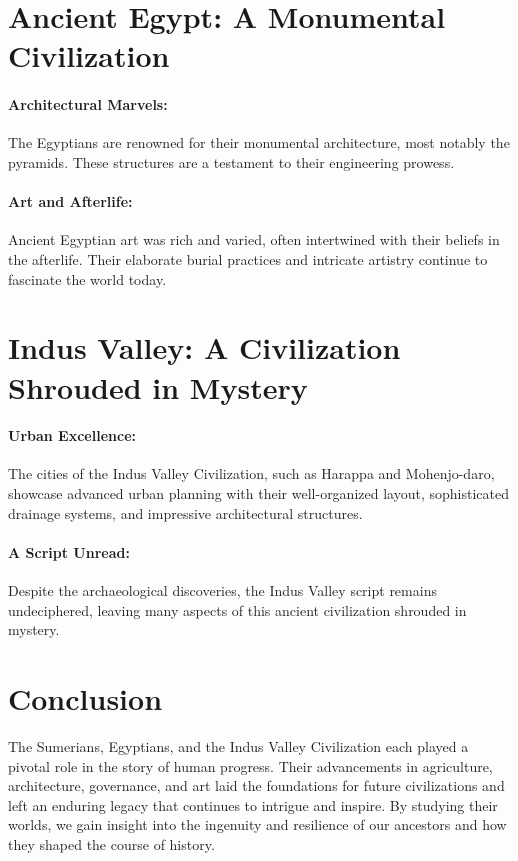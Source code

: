 \documentclass{book}
\begin{document}
\section*{Ancient Egypt: A Monumental Civilization}

\paragraph{Architectural Marvels:}
The Egyptians are renowned for their monumental architecture, most notably the pyramids. These structures are a testament to their engineering prowess.

\paragraph{Art and Afterlife:}
Ancient Egyptian art was rich and varied, often intertwined with their beliefs in the afterlife. Their elaborate burial practices and intricate artistry continue to fascinate the world today.

\section*{Indus Valley: A Civilization Shrouded in Mystery}

\paragraph{Urban Excellence:}
The cities of the Indus Valley Civilization, such as Harappa and Mohenjo-daro, showcase advanced urban planning with their well-organized layout, sophisticated drainage systems, and impressive architectural structures.

\paragraph{A Script Unread:}
Despite the archaeological discoveries, the Indus Valley script remains undeciphered, leaving many aspects of this ancient civilization shrouded in mystery.

\section*{Conclusion}

The Sumerians, Egyptians, and the Indus Valley Civilization each played a pivotal role in the story of human progress. Their advancements in agriculture, architecture, governance, and art laid the foundations for future civilizations and left an enduring legacy that continues to intrigue and inspire. By studying their worlds, we gain insight into the ingenuity and resilience of our ancestors and how they shaped the course of history.
\end{document}
